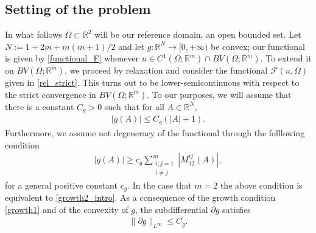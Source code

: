 \documentclass[a4paper,11pt]{article}
\numberwithin{equation}{section}
\newcommand{\Om}{\Omega}
\newcommand{\R}{\mathbb{R}}
\begin{document}
% 
% 
%
%
%



\subsection{Setting of the problem}\label{sec_setting}
In what follows $\Om\subset\R^2$ will be our reference domain, an open bounded set.
Let $N:=1+2m+m(m+1)/2$ and let $g:\R^{N}\rightarrow [0,+\infty)$ be convex; our functional is given by \eqref{functional_F}
whenever $u\in C^1(\Om;\R^m)\cap BV(\Om;\R^m)$. To extend it on $BV(\Om;\R^m)$, we proceed by relaxation and consider the functional $\mathcal F(u,\Om)$ given in \eqref{rel_strict}. This turns out to be lower-semicontinuous with respect to the strict convergence in $BV(\Om;\R^m)$.
%
To our purposes, we will assume that there is a constant $C_g>0$  such that for all $A\in \R^N$,
\begin{align}\label{growth1}
|g(A)|\leq C_g(|A|+1).
\end{align}
Furthermore, we assume not degeneracy of the functional through the folllowing condition
\begin{align}\label{growth2}
|g(A)|\geq c_g\sum_{\substack{i,j=1\\i\neq j}}^{m}|M_{12}^{ij}(A)|,
\end{align}
for a general positive constant $c_g$. In the case that $m=2$ the above condition is equivalent to \eqref{growth2_intro}.
As a consequence of the growth condition \eqref{growth1} and of the convexity of $g$, the subdifferential $\partial g$ satisfies
\begin{align}\label{growthbis}
\|\partial g\|_{L^\infty}\leq C_g.
\end{align}
\end{document}
